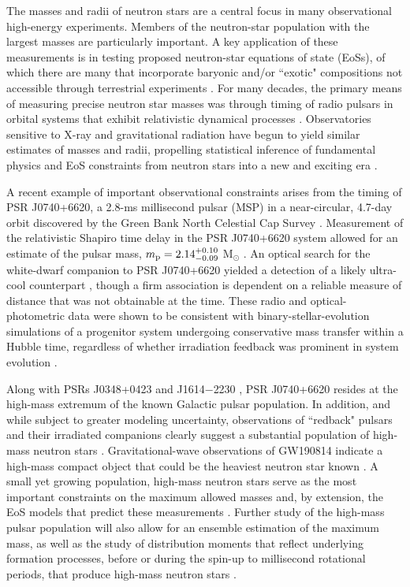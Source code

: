 \documentclass[twocolumn]{aastex63}
\begin{document}
The masses and radii of neutron stars are a central focus in many observational high-energy experiments. Members of the neutron-star population with the largest masses are particularly important. A key application of these measurements is in testing proposed neutron-star equations of state (EoSs), of which there are many that incorporate baryonic and/or ``exotic" compositions not accessible through terrestrial experiments \citep{of16}. For many decades, the primary means of measuring precise neutron star masses was through timing of radio pulsars in orbital systems that exhibit relativistic dynamical processes \citep[e.g.,][]{sta03}. Observatories sensitive to X-ray and gravitational radiation have begun to yield similar estimates of masses and radii, propelling statistical inference of fundamental physics and EoS constraints from neutron stars into a new and exciting era \citep[e.g.,][]{aaa+18,mld+19,rwb+19}.

A recent example of important observational constraints arises from the timing of PSR J0740+6620, a 2.8-ms millisecond pulsar (MSP) in a near-circular, 4.7-day orbit discovered by the Green Bank North Celestial Cap Survey \citep[GBNCC;][]{lsk+18}. Measurement of the relativistic Shapiro time delay \citep{sha64} in the PSR J0740+6620 system allowed for an estimate of the pulsar mass, $m_{\rm p} = 2.14^{+0.10}_{-0.09}$ M$_\odot$ \citep[68.3\% credibility;][]{cfr+20}. An optical search for the white-dwarf companion to PSR J0740+6620 yielded a detection of a likely ultra-cool counterpart \citep{bkk+19}, though a firm association is dependent on a reliable measure of distance that was not obtainable at the time. These radio and optical-photometric data were shown to be consistent with binary-stellar-evolution simulations of a progenitor system undergoing conservative mass transfer within a Hubble time, regardless of whether irradiation feedback was prominent in system evolution \citep{enbd20}.

Along with PSRs J0348+0423 \citep{afp+13} and J1614$-$2230 \citep[e.g.,][]{dpr+10}, PSR J0740+6620 resides at the high-mass extremum of the known Galactic pulsar population. In addition, and while subject to greater modeling uncertainty, observations of ``redback" pulsars and their irradiated companions clearly suggest a substantial population of high-mass neutron stars \citep[e.g.,][]{vbk11,lsc18,rkf+21}. Gravitational-wave observations of GW190814 indicate a high-mass compact object that could be the heaviest neutron star known \citep{aaa+20}. A small yet growing population, high-mass neutron stars serve as the most important constraints on the maximum allowed masses and, by extension, the EoS models that predict these measurements \citep[e.g.,][]{hkw+20,rgr+20,trs20}. Further study of the high-mass pulsar population will also allow for an ensemble estimation of the maximum mass, as well as the study of distribution moments that reflect underlying formation processes, before or during the spin-up to millisecond rotational periods, that produce high-mass neutron stars \citep[e.g.,][]{ato+16}.
\end{document}
